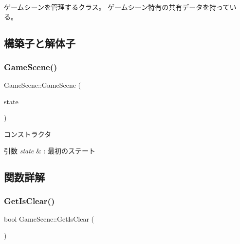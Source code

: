 ゲームシーンを管理するクラス。 ゲームシーン特有の共有データを持っている。 

\subsection{構築子と解体子}
\mbox{\label{class_game_scene_a7c9e00b7dddd016d9c07f8cb49e7bbb2}} 
\subsubsection{\texorpdfstring{Game\+Scene()}{GameScene()}}
{\footnotesize\ttfamily Game\+Scene\+::\+Game\+Scene (\begin{DoxyParamCaption}\item[{\mbox{\hyperlink{class_scene_bace_1_1_state_abstract}{State\+Abstract}} $\ast$}]{state }\end{DoxyParamCaption})\hspace{0.3cm}{\ttfamily [inline]}}



コンストラクタ 


\begin{DoxyParams}{引数}
{\em state} & \+: 最初のステート \\
\hline
\end{DoxyParams}


\subsection{関数詳解}
\mbox{\label{class_game_scene_afb9c99f2e9b94bfc4f151bed83b1a522}} 
\subsubsection{\texorpdfstring{Get\+Is\+Clear()}{GetIsClear()}}
{\footnotesize\ttfamily bool Game\+Scene\+::\+Get\+Is\+Clear (\begin{DoxyParamCaption}{ }\end{DoxyParamCaption})\hspace{0.3cm}{\ttfamily [inline]}}

\mbox{\label{class_game_scene_a903dffd64231c226daf27f22893893d8}} 
